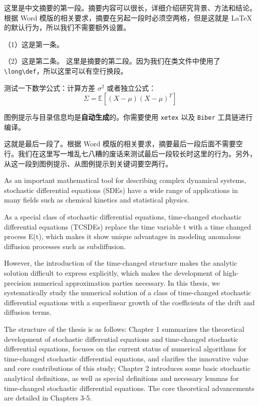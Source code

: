 \documentclass[bibbackend=biber]{csuthesis}
\theoremstyle{csutheorem}
\begin{document}
\begin{csuconfig}
    \begin{cnabstract}
        这里是中文摘要的第一段。摘要内容可以很长，详细介绍研究背景、方法和结论。根据 Word 模版的相关要求，摘要在另起一段时必须空两格，但是这就是 \LaTeX 的默认行为，所以我们不需要额外设置。

        （1）这是第一条。

        （2）这是第二条。
        这里是摘要的第二段。因为我们在类文件中使用了 \verb|\long\def|，所以这里可以有空行换段。

        测试一下数学公式：计算方差 $\sigma^2$ 或者独立公式：
        $$ \Sigma = \mathbb{E}[(X - \mu)(X - \mu)^T] $$

        图例提示与目录信息均是{\bfseries 自动生成}的。你需要使用 \verb|xetex| 以及 \verb|Biber| 工具链进行编译。

        这就是最后一段了。根据 Word 模版的相关要求，摘要最后一段后面不需要空行。我们在这里写一堆乱七八糟的废话来测试最后一段较长时这里的行为。另外，从这一段到图例提示、从图例提示到关键词要空两行。
    \end{cnabstract}
    \begin{enabstract}
        As an important mathematical tool for describing complex  dynamical systems, stochastic differential equations (SDEs) have a wide range of applications in many fields such as chemical kinetics and statistical physics.

        As a special class of stochastic differential equations, time-changed stochastic differential equations (TCSDEs) replace the time variable t with a time changed process E(t), which makes it show unique advantages in modeling
        anomalous diffusion processes such as subdiffusion.

        However, the introduction of the time-changed structure makes the analytic solution difficult
        to express explicitly, which makes the development of high-precision numerical approximation parties necessary.
        In this thesis, we systematically study the numerical solution of a class
        of time-changed stochastic differential equations with a superlinear growth
        of the coefficients of the drift and diffusion terms.

        The structure of the
        thesis is as follows: Chapter 1 summarizes the theoretical development
        of stochastic differential equations and time-changed stochastic differential equations, focuses on the current status of numerical algorithms for
        time-changed stochastic differential equations, and clarifies the innovative
        value and core contributions of this study; Chapter 2 introduces some basic
        stochastic analytical definitions, as well as special definitions and necessary
        lemmas for time-changed stochastic differential equations.
        The core theoretical advancements are detailed in Chapters 3-5.


\end{enabstract}
\end{csuconfig}
\end{document}
